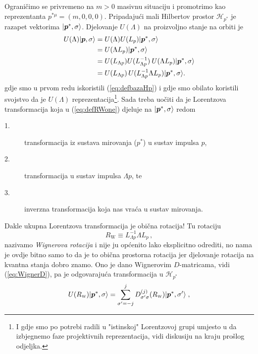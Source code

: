 Ograničimo se privremeno na $m > 0$ masivnu situaciju i promotrimo
kao reprezentanta $p^{*\mu} = (m, 0, 0, 0)$.
Pripadajući mali Hilbertov prostor $\mathcal{H}_{p^*}$ je razapet
vektorima $\ket{\vec{p}^{*}, \sigma}$. Djelovanje $U(\Lambda)$ na
proizvoljno stanje na orbiti je
\begin{align}
    U(\Lambda)\ket{\vec{p}, \sigma} &=  U(\Lambda) U(L_p) \ket{\vec{p}^{*}, \sigma} \\
     &= U(\Lambda L_p) \ket{\vec{p}^{*}, \sigma} \\
     &= U(L_{\Lambda p}) U(L_{\Lambda p}^{-1}) \: U(\Lambda L_p) \ket{\vec{p}^{*}, \sigma} \\
     &= U(L_{\Lambda p})\, U(L_{\Lambda p}^{-1} \Lambda L_p) \ket{\vec{p}^{*}, \sigma}
     \label{eq:defRWone}
.\end{align}
gdje smo u prvom redu iskoristili (\ref{eq:defbazaHp}) i gdje smo
obilato koristili svojstvo da je $U(\Lambda)$ reprezentacija\footnote{I gdje
smo po potrebi radili u "istinskoj" Lorentzovoj grupi 
umjesto u  da izbjegnemo faze projektivnih reprezentacija,
vidi diskusiju na kraju prošlog odjeljka.}.
Sada treba uočiti da je Lorentzova transformacija koja
u (\ref{eq:defRWone}) djeluje na $\ket{\vec{p}^{*}, \sigma}$ redom
\begin{description}
    \item[1.] transformacija iz sustava mirovanja ($p^*$) u sustav impulsa $p$,
    \item[2.] transformacija u sustav impulsa $\Lambda p$, te
    \item[3.] inverzna transformacija koja nas vraća u sustav mirovanja.
\end{description}
Dakle ukupna Lorentzova transformacija je obična rotacija!
Tu rotaciju
\begin{equation}
    R_{\scriptscriptstyle \mathrm{W}} \equiv L_{\Lambda p}^{-1} \Lambda L_p \,,
    \label{eq:defRW}
\end{equation}
nazivamo \emph{Wignerova rotacija} i nije ju općenito lako eksplicitno
odrediti, no nama je ovdje bitno samo to da je to obična prostorna rotacija
jer djelovanje rotacija na kvantna stanja dobro
znamo. Ono je dano Wignerovim $D$-matricama,
vidi (\ref{eq:WignerD}), pa je odgovarajuća transformacija u $\mathcal{H}_{p^*}$
\begin{equation}
    U(R_{\scriptscriptstyle\rm W}) \ket{\vec{p}^{*}, \sigma} = 
      \sum_{\sigma'=-j}^{j} D^{(j)}_{\sigma'\sigma}(R_{\scriptscriptstyle\rm W})
      \ket{\vec{p}^{*}, \sigma'} \;,
\end{equation}
